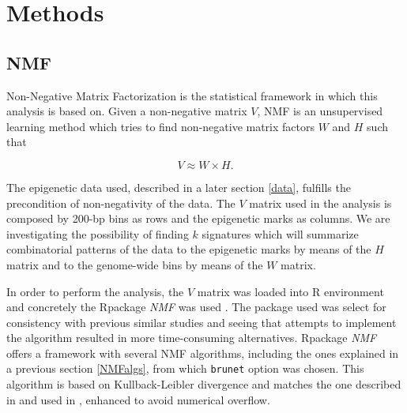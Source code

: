 
\chapter{Methods}\label{Methods} %


\section{NMF}

Non-Negative Matrix Factorization is the statistical framework in which this analysis is based on. Given a non-negative matrix \(V\), NMF is an unsupervised learning method which tries to find non-negative matrix factors \(W\) and \(H\) such that

\begin{equation}
     V \approx W \times H.
\end{equation}

The epigenetic data used, described in a later section \ref{data}, fulfills the precondition of non-negativity of the data. The \(V\) matrix used in the analysis is composed by 200-bp bins as rows and the epigenetic marks as columns. We are investigating the possibility of finding \(k\) signatures which will summarize combinatorial patterns of the data to the epigenetic marks by means of the \(H\) matrix and to the genome-wide bins by means of the \(W\) matrix.

\medskip

In order to perform the analysis, the \(V\) matrix was loaded into R environment and concretely the Rpackage \textit{NMF} was used \cite{Gaujoux2010}. The package used was select for consistency with previous similar studies \cite{Gandolfi2017} and seeing that attempts to implement the algorithm resulted in more time-consuming alternatives. Rpackage \textit{NMF} offers a framework with several NMF algorithms, including the ones explained in a previous section \ref{NMFalgs}, from which \texttt{brunet} option was chosen. This algorithm is based on Kullback-Leibler divergence and matches the one described in \cite{Lee2001} and used in \cite{Brunet2004}, enhanced to avoid numerical overflow.

